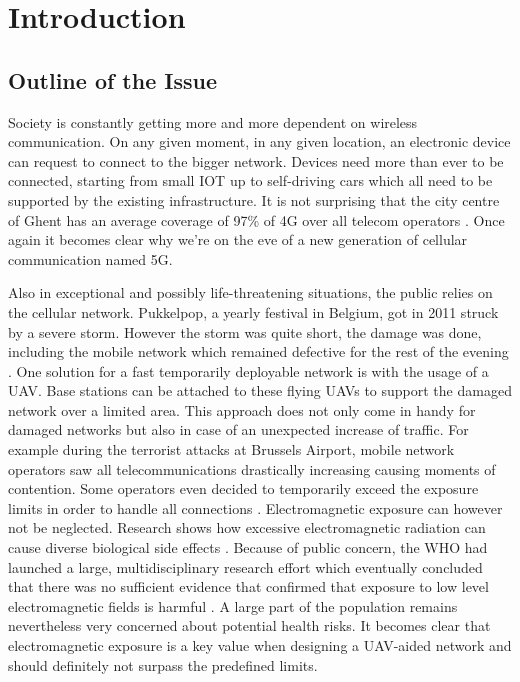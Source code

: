 \chapter{Introduction}
\label{chap:intro}

\section{Outline of the Issue} %
\label{sec:issue}

Society is constantly getting more and more dependent on wireless communication. 
On any given moment, in any given location, an electronic device
can request to connect to the bigger network. Devices need more than ever to be connected, 
starting from small \gls{IOT} up to self-driving cars
which all need to be supported by the existing infrastructure. 
It is not surprising that the city centre of Ghent has an average coverage of 97\% of 4G over all telecom operators
\cite{testaankoop}. Once again it becomes clear why we're on the eve of a new generation of cellular communication named 5G. 

Also in exceptional and possibly life-threatening situations, the public relies on the cellular network. 
Pukkelpop, a yearly festival in Belgium, got in 2011 struck by a severe storm. However the storm 
was quite short, the damage was done, including the mobile network which remained defective for the rest of the evening \cite{pukkelpop}.
One solution for a fast temporarily deployable network is with the usage of a \gls{UAV}. Base stations can be attached to 
these flying \gls{UAV}s to support the damaged network over a limited area. 
This approach does not only come in handy for 
damaged networks but also in case of an unexpected increase of traffic. 
For example during the terrorist attacks at Brussels Airport,
mobile network operators saw all telecommunications drastically increasing causing moments of contention. 
Some operators even decided to temporarily exceed the exposure limits in
order to handle all connections \cite{baseZaventem}.
Electromagnetic exposure can however not be neglected. Research shows how excessive electromagnetic radiation can cause diverse biological side effects \cite{bioeffects}.
Because of public concern, the \gls{WHO} had launched a large, multidisciplinary research effort which eventually concluded that there was no sufficient evidence that confirmed 
that exposure to low level electromagnetic fields is harmful \cite{WHO}. 
A large part of the population remains nevertheless very concerned about potential health risks.
It becomes clear that electromagnetic exposure is a key value when designing a \gls{UAV}-aided network and should definitely 
not surpass the predefined limits.


